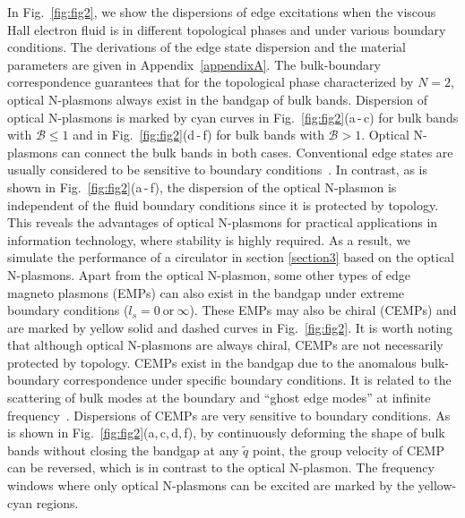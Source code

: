 \documentclass[%
reprint,
amsmath,amssymb,
aps,superscriptaddress
]{revtex4-2}
\begin{document}
In Fig.~\ref{fig:fig2}, we show the dispersions of edge excitations when the viscous Hall electron fluid is in different topological phases and under various boundary conditions. The derivations of the edge state dispersion and the material parameters are given in Appendix~\ref{appendixA}. The bulk-boundary correspondence guarantees that for the topological phase characterized by $N=2$, optical N-plasmons always exist in the bandgap of bulk bands. Dispersion of optical N-plasmons is marked by cyan curves in Fig.~\ref{fig:fig2}(a\,-\,c) for bulk bands with $\mathcal{B} \leqslant 1$ and in Fig.~\ref{fig:fig2}(d\,-\,f) for bulk bands with $\mathcal{B} > 1$. Optical N-plasmons can connect the bulk bands in both cases. Conventional edge states are usually considered to be sensitive to boundary conditions~\cite{kiselev2019boundary}. In contrast, as is shown in Fig.~\ref{fig:fig2}(a\,-\,f), the dispersion of the optical N-plasmon is independent of the fluid boundary conditions since it is protected by topology. This reveals the advantages of optical N-plasmons for practical applications in information technology, where stability is highly required. As a result, we simulate the performance of a circulator in section \ref{section3} based on the optical N-plasmons. Apart from the optical N-plasmon, some other types of edge magneto plasmons (EMPs) can also exist in the bandgap under extreme boundary conditions ($l_s=0 \ \mathrm{or} \ \infty$). These EMPs may also be chiral (CEMPs) and are marked by yellow solid and dashed curves in Fig.~\ref{fig:fig2}. It is worth noting that although optical N-plasmons are always chiral, CEMPs are not necessarily protected by topology. CEMPs exist in the bandgap due to the anomalous bulk-boundary correspondence under specific boundary conditions. It is related to the scattering of bulk modes at the boundary and ``ghost edge modes'' at infinite frequency~\cite{tauber2020anomalous}. Dispersions of CEMPs are very sensitive to boundary conditions.  As is shown in Fig.~\ref{fig:fig2}(a,\,c,\,d,\,f), by continuously deforming the shape of bulk bands without closing the bandgap at any $\tilde{q}$ point, the group velocity of CEMP can be reversed, which is in contrast to the optical N-plasmon. The frequency windows where only optical N-plasmons can be excited are marked by the yellow-cyan regions.
\end{document}
